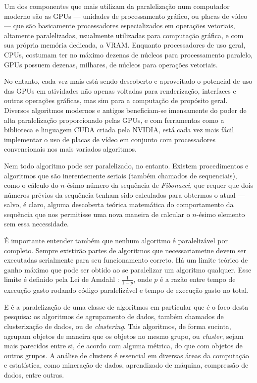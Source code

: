\documentclass[12pt,
openright, 
oneside, %
a4paper,    %
brazil]{facom-ufu-abntex2}
\begin{document}
Um dos componentes que mais utilizam da paralelização num computador moderno são as GPUs --- unidades de processamento gráfico, ou placas de vídeo --- que são basicamente processadores especializados em operações vetoriais, altamente paralelizadas, usualmente utilizadas para computação gráfica, e com sua própria memória dedicada, a VRAM. Enquanto processadores de uso geral, CPUs, costumam ter no máximo dezenas de núcleos para processamento paralelo, GPUs possuem dezenas, milhares, de núcleos para operações vetoriais.

No entanto, cada vez mais está sendo descoberto e aproveitado o potencial de uso das GPUs em atividades não apenas voltadas para renderização, interfaces e outras operações gráficas, mas sim para a computação de propósito geral. Diversos algoritmos modernos e antigos beneficiam-se imensamente do poder de alta paralelização proporcionado pelas GPUs, e com ferramentas como a biblioteca e linguagem CUDA criada pela NVIDIA, está cada vez mais fácil implementar o uso de placas de vídeo em conjunto com processadores convencionais nos mais variados algoritmos.

Nem todo algoritmo pode ser paralelizado, no entanto. Existem procedimentos e algoritmos que são inerentemente seriais (também chamados de sequenciais), como o cálculo do $n$-ésimo número da sequência de \textit{Fibonacci}, que requer que dois números prévios da sequência tenham sido calculados para obtermos o atual --- salvo, é claro, alguma descoberta teórica matemática do comportamento da sequência que nos permitisse uma nova maneira de calcular o $n$-ésimo elemento sem essa necessidade.

É importante entender também que nenhum algoritmo é paralelizável por completo. Sempre existirão partes de algoritmos que necessariametne devem ser executadas serialmente para seu funcionamento correto. Há um limite teórico de ganho máximo que pode ser obtido ao se paralelizar um algoritmo qualquer. Esse limite é definido pela Lei de Amdahl \cite{Amdahl-Law}: $\frac{1}{1-p}$, onde $p$ é a razão entre tempo de execução gasto rodando código paralelizável e tempo de execução gasto no total.

E é a paralelização de uma classe de algoritmos em particular que é o foco desta pesquisa: os algoritmos de agrupamento de dados, também chamados de clusterização de dados, ou de \textit{clustering}. Tais algoritmos, de forma sucinta, agrupam objetos de maneira que os objetos no mesmo grupo, ou \textit{cluster}, sejam mais parecidos entre si, de acordo com alguma métrica, do que com objetos de outros grupos. A análise de clusters é essencial em diversas áreas da computação e estatística, como mineração de dados, aprendizado de máquina, compressão de dados, entre outras.
\end{document}
